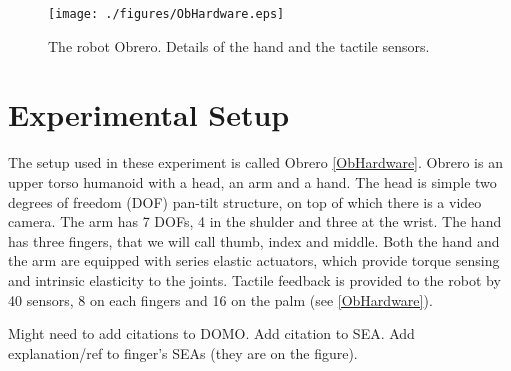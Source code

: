 \begin{figure*}[htbp]
\centerline{
\texttt{[image: ./figures/ObHardware.eps]}
} \caption[ObHardware]{The robot Obrero. Details of the hand and the 
tactile sensors.}
\label{fig:ObHardware}
\end{figure*}

\section{Experimental Setup} 
%
The setup used in these experiment is called Obrero \ref{ObHardware}. 
Obrero is an upper 
torso humanoid with a head, an arm and a hand. The head is simple
two degrees of freedom (DOF) pan-tilt structure, on top of which 
there is a video camera. The arm has 7 DOFs, 4 in the shulder and 
three at the wrist. The hand has three fingers, that we will call 
thumb, index and middle. Both the hand and the arm are equipped 
with series elastic actuators, which provide torque sensing and 
intrinsic elasticity to the joints. Tactile feedback is provided 
to the robot by 40 sensors, 8 on each fingers and 16 on the palm 
(see \ref{ObHardware}).

Might need to add citations to DOMO.
Add citation to SEA.
Add explanation/ref to finger's SEAs (they are on the figure).





